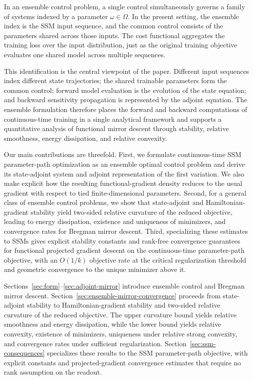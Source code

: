\documentclass[11pt]{amsart}
\numberwithin{equation}{section} %
\theoremstyle{remark}
\begin{document}
In an ensemble control problem, a single control simultaneously governs a family of systems indexed by a parameter $\omega \in \Omega$. In the present setting, the ensemble index is the SSM input sequence, and the common control consists of the parameters shared across those inputs. The cost functional aggregates the training loss over the input distribution, just as the original training objective evaluates one shared model across multiple sequences.

This identification is the central viewpoint of the paper. Different input sequences index different state trajectories; the shared trainable parameters form the common control; forward model evaluation is the evolution of the state equation; and backward sensitivity propagation is represented by the adjoint equation. The ensemble formulation therefore places the forward and backward computations of continuous-time training in a single analytical framework and supports a quantitative analysis of functional mirror descent through stability, relative smoothness, energy dissipation, and relative convexity.

Our main contributions are threefold. First, we formulate continuous-time SSM
parameter-path optimization as an ensemble optimal control problem and derive its
state-adjoint system and adjoint representation of the first variation. We also
make explicit how the resulting functional-gradient density reduces to the usual
gradient with respect to tied finite-dimensional parameters. Second, for a general
class of ensemble control problems, we show that state-adjoint and
Hamiltonian-gradient stability yield two-sided relative curvature of the reduced objective, leading to energy dissipation, existence and uniqueness of minimizers, and convergence rates for Bregman mirror descent. Third, specializing these estimates to SSMs gives explicit stability constants and rank-free convergence guarantees for functional projected gradient descent on the continuous-time parameter-path objective, with an $O(1/k)$ objective rate at the critical regularization threshold and geometric convergence to the unique minimizer above it.

Sections~\ref{sec:form}--\ref{sec:adjoint-mirror} introduce ensemble control and Bregman mirror descent. Section~\ref{sec:ensemble-mirror-convergence} proceeds from state-adjoint stability to Hamiltonian-gradient stability and two-sided relative curvature of the reduced objective. The upper curvature bound yields relative smoothness and energy dissipation, while the lower bound yields relative convexity, existence of minimizers, uniqueness under relative strong convexity, and convergence rates under sufficient regularization. Section~\ref{sec:ssm-consequences} specializes these results to the SSM parameter-path objective, with explicit constants and projected-gradient convergence estimates that require no rank assumption on the readout.
\end{document}
